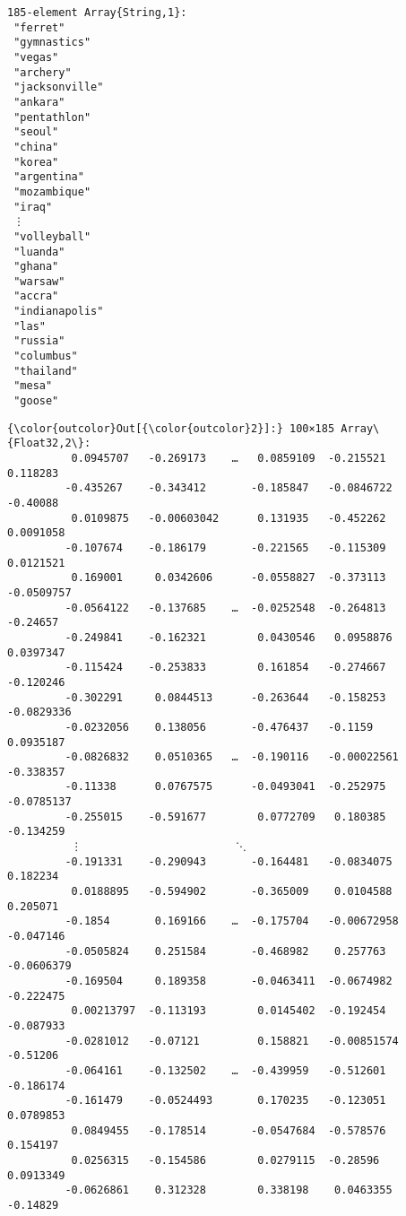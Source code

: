 \documentclass[11pt]{article}
\begin{document}
    
    \begin{verbatim}
185-element Array{String,1}:
 "ferret"      
 "gymnastics"  
 "vegas"       
 "archery"     
 "jacksonville"
 "ankara"      
 "pentathlon"  
 "seoul"       
 "china"       
 "korea"       
 "argentina"   
 "mozambique"  
 "iraq"        
 ⋮             
 "volleyball"  
 "luanda"      
 "ghana"       
 "warsaw"      
 "accra"       
 "indianapolis"
 "las"         
 "russia"      
 "columbus"    
 "thailand"    
 "mesa"        
 "goose"       
    \end{verbatim}

    
            \begin{Verbatim}[commandchars=\\\{\}]
{\color{outcolor}Out[{\color{outcolor}2}]:} 100×185 Array\{Float32,2\}:
          0.0945707   -0.269173    …   0.0859109  -0.215521     0.118283 
         -0.435267    -0.343412       -0.185847   -0.0846722   -0.40088  
          0.0109875   -0.00603042      0.131935   -0.452262     0.0091058
         -0.107674    -0.186179       -0.221565   -0.115309     0.0121521
          0.169001     0.0342606      -0.0558827  -0.373113    -0.0509757
         -0.0564122   -0.137685    …  -0.0252548  -0.264813    -0.24657  
         -0.249841    -0.162321        0.0430546   0.0958876    0.0397347
         -0.115424    -0.253833        0.161854   -0.274667    -0.120246 
         -0.302291     0.0844513      -0.263644   -0.158253    -0.0829336
         -0.0232056    0.138056       -0.476437   -0.1159       0.0935187
         -0.0826832    0.0510365   …  -0.190116   -0.00022561  -0.338357 
         -0.11338      0.0767575      -0.0493041  -0.252975    -0.0785137
         -0.255015    -0.591677        0.0772709   0.180385    -0.134259 
          ⋮                        ⋱                                     
         -0.191331    -0.290943       -0.164481   -0.0834075    0.182234 
          0.0188895   -0.594902       -0.365009    0.0104588    0.205071 
         -0.1854       0.169166    …  -0.175704   -0.00672958  -0.047146 
         -0.0505824    0.251584       -0.468982    0.257763    -0.0606379
         -0.169504     0.189358       -0.0463411  -0.0674982   -0.222475 
          0.00213797  -0.113193        0.0145402  -0.192454    -0.087933 
         -0.0281012   -0.07121         0.158821   -0.00851574  -0.51206  
         -0.064161    -0.132502    …  -0.439959   -0.512601    -0.186174 
         -0.161479    -0.0524493       0.170235   -0.123051     0.0789853
          0.0849455   -0.178514       -0.0547684  -0.578576     0.154197 
          0.0256315   -0.154586        0.0279115  -0.28596      0.0913349
         -0.0626861    0.312328        0.338198    0.0463355   -0.14829  
\end{Verbatim}
        
\end{document}
